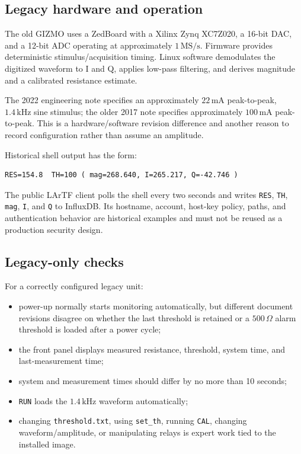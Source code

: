\documentclass[11pt]{article}
\newcommand{\GIZMO}{\textsc{GIZMO}}
\begin{document}
\subsection{Legacy hardware and operation}

The old \GIZMO{} uses a ZedBoard with a Xilinx Zynq XC7Z020, a 16-bit DAC, and a 12-bit ADC operating at approximately $1\,\mathrm{MS/s}$. Firmware provides deterministic stimulus/acquisition timing. Linux software demodulates the digitized waveform to I and Q, applies low-pass filtering, and derives magnitude and a calibrated resistance estimate.

The 2022 engineering note specifies an approximately $22\,\mathrm{mA}$ peak-to-peak, $1.4\,\mathrm{kHz}$ sine stimulus; the older 2017 note specifies approximately $100\,\mathrm{mA}$ peak-to-peak. This is a hardware/software revision difference and another reason to record configuration rather than assume an amplitude.

Historical shell output has the form:

\begin{verbatim}
RES=154.8  TH=100 ( mag=268.640, I=265.217, Q=-42.746 )
\end{verbatim}

The public LArTF client polls the shell every two seconds and writes \texttt{RES}, \texttt{TH}, \texttt{mag}, \texttt{I}, and \texttt{Q} to InfluxDB. Its hostname, account, host-key policy, paths, and authentication behavior are historical examples and must not be reused as a production security design.

\subsection{Legacy-only checks}

For a correctly configured legacy unit:

\begin{itemize}
  \item power-up normally starts monitoring automatically, but different document revisions disagree on whether the last threshold is retained or a $500\,\Omega$ alarm threshold is loaded after a power cycle;
  \item the front panel displays measured resistance, threshold, system time, and last-measurement time;
  \item system and measurement times should differ by no more than 10 seconds;
  \item \texttt{RUN} loads the $1.4\,\mathrm{kHz}$ waveform automatically;
  \item changing \texttt{threshold.txt}, using \texttt{set\_th}, running \texttt{CAL}, changing waveform/amplitude, or manipulating relays is expert work tied to the installed image.
\end{itemize}
\end{document}
